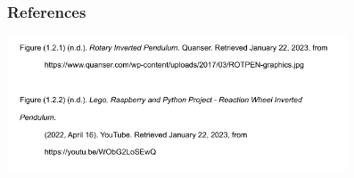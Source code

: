 \documentclass[aspectratio=169]{beamer}
\begin{document}
\begin{frame}
    \frametitle{References}

    \includegraphics[height=4cm]{references}
\end{frame}
\end{document}

